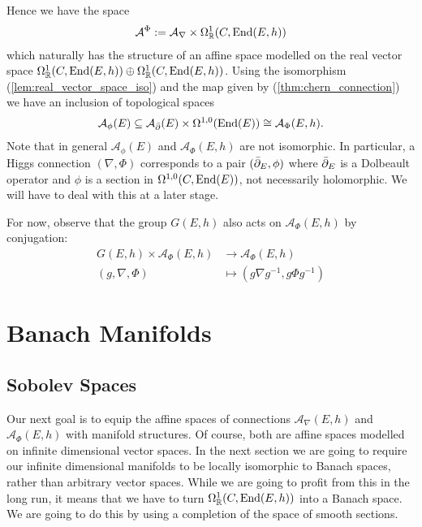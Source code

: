 \documentclass[12pt]{ociamthesis}  %
\begin{document}
Hence we have the space
\begin{align}\label{eq:Higgs_connections_space}
  \mathcal A^{\Phi} := \mathcal A_\nabla \times \Omega^1_{\mathbb{R}}(C,\operatorname{End}(E,h))
\end{align}
which naturally has the structure of an affine space modelled on
the real vector space
$\Omega^1_{\mathbb{R}}(C,\operatorname{End}(E,h))\oplus\Omega_{\mathbb{R}}^1(C,\operatorname{End}(E,h))$. Using the isomorphism (\ref{lem:real_vector_space_iso})
and the map given by (\ref{thm:chern_connection}) we have an inclusion
of topological spaces
\begin{align*}
  \mathcal A_\phi(E) \subseteq \mathcal A_{\bar{\partial}} (E) \times \Omega^{1,0}(\operatorname{End}(E)) \cong \mathcal A_\Phi (E,h).
\end{align*}
Note that in general $\mathcal A_\phi(E)$ and $\mathcal A_\Phi (E,h)$ are not isomorphic. In
particular, a Higgs connection $(\nabla,\Phi)$ corresponds to
a pair $({\bar{\partial}}_E,\phi)$ where ${\bar{\partial}}_E$ is a Dolbeault operator and
$\phi$ is a section in $\Omega^{1,0}(C,\operatorname{End}(E))$, not necessarily
holomorphic. We will have to deal with this at a later stage.

For now, observe that the group $G(E,h)$ also acts on $\mathcal A_\Phi (E,h)$
by conjugation:
\begin{align*}
  G(E,h) \times \mathcal A_\Phi (E,h) & \to \mathcal A_\Phi (E,h)               \\
  (g,\nabla,\Phi)                     & \mapsto (g\nabla{g}^{-1},g\Phi{g}^{-1})
\end{align*}

\section{Banach Manifolds}

\subsection{Sobolev Spaces}

Our next goal is to equip the affine spaces of connections $\mathcal A_\nabla(E,h)$
and $\mathcal A_\Phi (E,h)$ with manifold structures. Of course, both are affine
spaces modelled on infinite dimensional vector spaces. In the next
section we are going to require our infinite dimensional manifolds to
be locally isomorphic to Banach spaces, rather than arbitrary
vector spaces. While we are going to profit from this in the long run,
it means that we have to turn $\Omega^1_{\mathbb{R}}(C,\operatorname{End}(E,h))$
into a Banach space. We are going to do this by using a completion of
the space of smooth sections.
\end{document}
